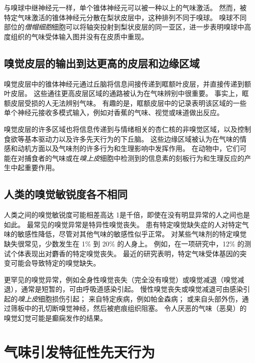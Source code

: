 与嗅球中继神经元一样，单个锥体神经元可以被一种以上的气味激活。
然而，被特定气味激活的锥体神经元分散在梨状皮层中，这种排列不同于嗅球。
嗅球不同部位的\textit{僧帽细胞}细胞可以将轴突投射到梨状皮层的同一亚区，进一步表明嗅球中高度组织的气味受体输入图并没有在皮质中重现。



\subsection{嗅觉皮层的输出到达更高的皮层和边缘区域}

嗅觉皮层中的锥体神经元通过丘脑将信息间接传递到眶额叶皮层，并直接传递到额叶皮层。
这些通往更高皮层区域的通路被认为在气味辨别中很重要。
事实上，眶额皮层受损的人无法辨别气味。
有趣的是，眶额皮层中的记录表明该区域的一些单个神经元接收多模式输入，例如对香蕉的气味、视觉或味道做出反应。


嗅觉皮层的许多区域也将信息传递到与情绪相关的杏仁核的非嗅觉区域，以及控制食欲等基本驱动力以及许多先天行为的下丘脑。
这些边缘区域被认为在气味的情感和动机方面以及气味剂的许多行为和生理影响中发挥作用。
在动物中，它们可能在对捕食者的气味或在\textit{嗅上皮}细胞中检测到的信息素的刻板行为和生理反应的产生中起重要作用。



\subsection{人类的嗅觉敏锐度各不相同}

人类之间的嗅觉敏锐度可能相差高达 1是千倍，即使在没有明显异常的人之间也是如此。
最常见的嗅觉异常是特异性嗅觉丧失。
患有特定嗅觉缺失症的人对特定气味的敏感性降低，尽管对其他气味的敏感性似乎正常。
对某些气味剂的特定嗅觉缺失很常见，少数发生在 1\% 到 20\% 的人身上。
例如，在一项研究中，12\% 的测试个体表现出对麝香的特定嗅觉丧失。
最近的研究表明，特定气味受体基因的突变可能会导致特定的嗅觉缺失。


更罕见的嗅觉异常，例如全身性嗅觉丧失（完全没有嗅觉）或嗅觉减退（嗅觉减退），通常是短暂的，可由呼吸道感染引起。
慢性嗅觉丧失或嗅觉减退可由感染引起的\textit{嗅上皮}细胞损伤引起；
来自特定疾病，例如帕金森病；
或来自头部外伤，通过筛板中的孔切断嗅觉神经，然后被疤痕组织阻塞。
令人厌恶的气味（恶臭）的嗅觉幻觉可能是癫痫发作的结果。



\section{气味引发特征性先天行为}

